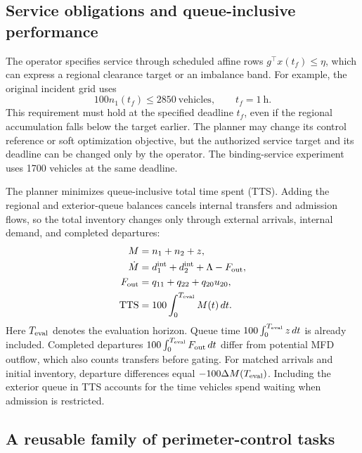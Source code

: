 \documentclass[preprint,12pt]{elsarticle}
\begin{document}
\subsection{Service obligations and queue-inclusive performance}

The operator specifies service through scheduled affine rows
$g^\top x(t_f)\le\eta$, which can express a regional clearance target or an
imbalance band. For example, the original incident grid uses
\begin{equation}
100n_1(t_f)\le2850\ \text{vehicles},\qquad t_f=1\ \text{h}.
\label{eq:new-service}
\end{equation}
This requirement must hold at the specified deadline \(t_f\), even if the regional accumulation falls below the target earlier. The planner may change its control reference or soft optimization objective, but the authorized service target and its deadline can be changed only by the operator. The binding-service experiment uses 1700 vehicles
at the same deadline.

The planner minimizes queue-inclusive total time spent (TTS). Adding the regional and exterior-queue balances cancels internal transfers and admission flows, so the total inventory changes only through external arrivals, internal demand, and completed departures:
\begin{equation}
\begin{aligned}
M&=n_1+n_2+z,\\
\dot M&=d^{\rm int}_1+d^{\rm int}_2+\Lambda-F_{\rm out},\\
F_{\rm out}&=q_{11}+q_{22}+q_{20}u_{20},\\
\mathrm{TTS}&=100\int_0^{T_{\rm eval}} M(t)\,dt.
\end{aligned}
\label{eq:new-conservation}
\end{equation}
Here $T_{\rm eval}$ denotes the evaluation horizon. Queue time
$100\int_0^{T_{\rm eval}} z\,dt$ is already included. Completed departures
$100\int_0^{T_{\rm eval}} F_{\rm out}\,dt$ differ from potential MFD outflow,
which also counts transfers before gating. For matched arrivals and initial
inventory, departure differences equal
$-100\Delta M(T_{\rm eval})$. Including the exterior queue in TTS accounts for the time vehicles spend
waiting when admission is restricted.

\subsection{A reusable family of perimeter-control tasks}
\label{sec:benchmark-formulation}
\end{document}
